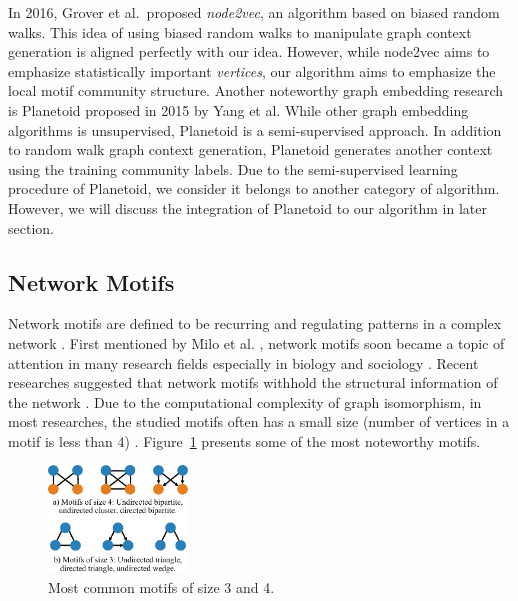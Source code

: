 \documentclass[letterpaper]{article}
\begin{document}
            In 2016, Grover et al.\ proposed \emph{node2vec}, an algorithm based on biased random
            walks. This idea of using biased random walks to manipulate graph context generation
            is aligned perfectly with our idea. However, while node2vec aims to emphasize statistically
            important \emph{vertices}, our algorithm aims to emphasize the local motif community
            structure. Another noteworthy graph embedding research is Planetoid \cite{planetoid} 
            proposed in 2015 by Yang et al. While other graph embedding algorithms is unsupervised, 
            Planetoid is a semi-supervised approach. In addition to random walk graph context generation, 
            Planetoid generates another context using the training community labels. Due to the
            semi-supervised learning procedure of Planetoid, we consider it belongs to another
            category of algorithm. However, we will discuss the integration of Planetoid to our
            algorithm in later section.

        \subsection{Network Motifs}

            Network motifs are defined to be recurring and regulating patterns in a complex network 
            \cite{netmotif}. First mentioned by Milo et al. \cite{motifblockmilo}, network motifs
            soon became a topic of attention in many research fields especially in biology and sociology
            \cite{masoudirev}. Recent researches suggested that network motifs withhold the structural 
            information of the network \cite{juremotif,harvardmotif,deepgraphkernel}. Due to the
            computational complexity of graph isomorphism, in most researches, the studied motifs 
            often has a small size (number of vertices in a motif is less than 4) \cite{motifdecrev}.
            Figure~\ref{fig:motifs} presents some of the most noteworthy motifs.

            \begin{figure}
                \centering
                \includegraphics[width=0.33\textwidth]{fig7_motifs}
                \caption{Most common motifs of size 3 and 4.}
                \label{fig:motifs}
            \end{figure}
\end{document}
